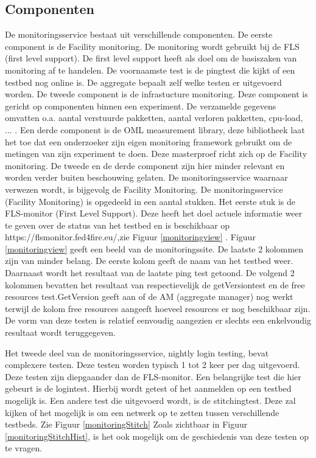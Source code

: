 \subsection{Componenten}
\npar
De monitoringsservice bestaat uit verschillende componenten. De eerste component is de Facility monitoring. De monitoring wordt gebruikt bij de FLS (first level support). De first level support heeft als doel om de basiszaken van monitoring af te handelen. De voornaamste test is de pingtest die kijkt of een testbed nog online is. De aggregate bepaalt zelf welke testen er uitgevoerd worden.
\clearpage
\npar
De tweede component is de infrastucture monitoring. Deze component is gericht op componenten binnen een experiment. De verzamelde gegevens omvatten o.a. aantal verstuurde pakketten, aantal verloren pakketten, cpu-load, ... .
\npar
Een derde component is de OML measurement library, deze bibliotheek laat het toe dat een onderzoeker zijn eigen monitoring framework gebruikt om de metingen van zijn experiment te doen.
\npar
Deze masterproef richt zich op de Facility monitoring. De tweede en de derde component zijn hier minder relevant en worden verder buiten beschouwing gelaten. De monitoringsservice waarnaar verwezen wordt, is bijgevolg de Facility Monitoring.
\npar
De monitoringsservice (Facility Monitoring) is opgedeeld in een aantal stukken. Het eerste stuk is de FLS-monitor (First Level Support). Deze heeft het doel actuele informatie weer te geven over de status van het testbed en is beschikbaar op https://flsmonitor.fed4fire.eu/,zie  Figuur \ref{monitoringview} .
\npar
Figuur \ref{monitoringview} geeft een beeld van de monitoringssite. De laatste 2 kolommen zijn van minder belang. De eerste kolom geeft de naam van het testbed weer. Daarnaast wordt het resultaat van de laatste ping test getoond. De volgend 2 kolommen bevatten het resultaat van respectievelijk de getVersiontest en de free resources test.GetVersion geeft aan of de AM (aggregate manager) nog werkt terwijl de kolom free resources aangeeft hoeveel resources er nog beschikbaar zijn. De vorm van deze testen is relatief eenvoudig aangezien er slechts een enkelvoudig resultaat wordt teruggegeven.

\clearpage
\npar
Het tweede deel van de monitoringsservice, nightly login testing, bevat complexere testen. Deze testen worden typisch 1 tot 2 keer per dag uitgevoerd. Deze testen zijn diepgaander dan de FLS-monitor. Een belangrijke test die hier gebeurt is de logintest. Hierbij wordt getest of het aanmelden op een testbed mogelijk is. Een andere test die uitgevoerd wordt, is de stitchingtest. Deze zal kijken of het mogelijk is om een netwerk op te zetten tussen verschillende testbeds. Zie Figuur \ref{monitoringStitch}
Zoals zichtbaar in Figuur \ref{monitoringStitchHist}, is het ook mogelijk om de geschiedenis van deze testen op te vragen. 
\clearpage
